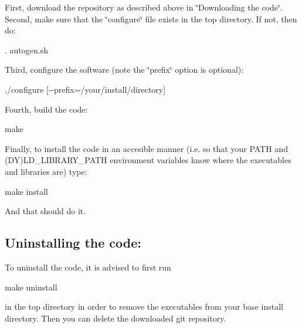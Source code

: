 First, download the repository as described above in \char`\"{}\+Downloading 
the code\char`\"{}. Second, make sure that the \char`\"{}configure\char`\"{} file exists in the top directory. If not, then do\+:

{\ttfamily . autogen.\+sh}

Third, configure the software (note the \char`\"{}prefix\char`\"{} option is optional)\+:

{\ttfamily ./configure \mbox{[}-\/-\/prefix=/your/install/directory\mbox{]}}

Fourth, build the code\+:

{\ttfamily make}

Finally, to install the code in an accesible manner (i.\+e. so that your P\+A\+T\+H and (D\+Y)L\+D\+\_\+\+L\+I\+B\+R\+A\+R\+Y\+\_\+\+P\+A\+T\+H environment variables know where the executables and libraries are) type\+:

{\ttfamily make install}

And that should do it.

\subsection*{Uninstalling the code\+: }

To uninstall the code, it is advised to first run

{\ttfamily make uninstall}

in the top directory in order to remove the executables from your base install directory. Then you can delete the downloaded git repository. 